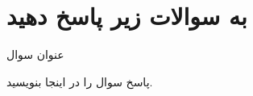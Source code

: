 \section{به سوالات زیر پاسخ دهید}




عنوان سوال
\begin{qsolve}
پاسخ سوال را در اینجا بنویسید.
\end{qsolve}

